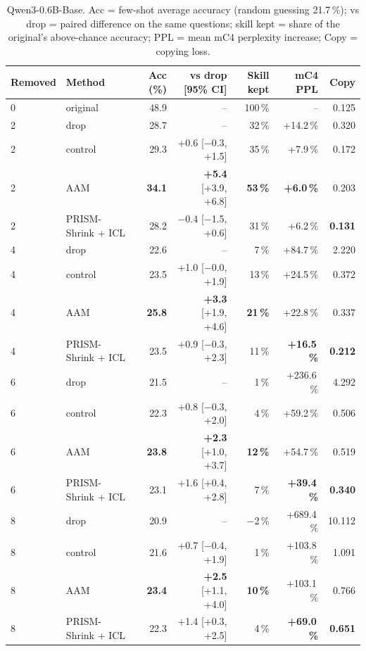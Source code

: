 \documentclass[11pt]{article}
\begin{document}
\begin{table}[t]
\centering\small
\begin{tabular}{llrrrrr}
\toprule
Removed & Method & Acc (\%) & vs drop [95\% CI] & Skill kept & mC4 PPL & Copy \\
\midrule
0 & original & 48.9 & -- & 100\,\% & -- & 0.125 \\
\midrule
2 & drop & 28.7 & -- & 32\,\% & +14.2\,\% & 0.320 \\
2 & control & 29.3 & +0.6 [$-$0.3, +1.5] & 35\,\% & +7.9\,\% & 0.172 \\
2 & AAM & \textbf{34.1} & \textbf{+5.4} [+3.9, +6.8] & \textbf{53\,\%} & \textbf{+6.0\,\%} & 0.203 \\
2 & PRISM-Shrink + ICL & 28.2 & $-$0.4 [$-$1.5, +0.6] & 31\,\% & +6.2\,\% & \textbf{0.131} \\
\midrule
4 & drop & 22.6 & -- & 7\,\% & +84.7\,\% & 2.220 \\
4 & control & 23.5 & +1.0 [$-$0.0, +1.9] & 13\,\% & +24.5\,\% & 0.372 \\
4 & AAM & \textbf{25.8} & \textbf{+3.3} [+1.9, +4.6] & \textbf{21\,\%} & +22.8\,\% & 0.337 \\
4 & PRISM-Shrink + ICL & 23.5 & +0.9 [$-$0.3, +2.3] & 11\,\% & \textbf{+16.5\,\%} & \textbf{0.212} \\
\midrule
6 & drop & 21.5 & -- & 1\,\% & +236.6\,\% & 4.292 \\
6 & control & 22.3 & +0.8 [$-$0.3, +2.0] & 4\,\% & +59.2\,\% & 0.506 \\
6 & AAM & \textbf{23.8} & \textbf{+2.3} [+1.0, +3.7] & \textbf{12\,\%} & +54.7\,\% & 0.519 \\
6 & PRISM-Shrink + ICL & 23.1 & +1.6 [+0.4, +2.8] & 7\,\% & \textbf{+39.4\,\%} & \textbf{0.340} \\
\midrule
8 & drop & 20.9 & -- & $-$2\,\% & +689.4\,\% & 10.112 \\
8 & control & 21.6 & +0.7 [$-$0.4, +1.9] & 1\,\% & +103.8\,\% & 1.091 \\
8 & AAM & \textbf{23.4} & \textbf{+2.5} [+1.1, +4.0] & \textbf{10\,\%} & +103.1\,\% & 0.766 \\
8 & PRISM-Shrink + ICL & 22.3 & +1.4 [+0.3, +2.5] & 4\,\% & \textbf{+69.0\,\%} & \textbf{0.651} \\
\bottomrule
\end{tabular}
\caption{Qwen3-0.6B-Base. Acc = few-shot average accuracy (random guessing 21.7\,\%); vs drop = paired difference
on the same questions; skill kept = share of the original's above-chance accuracy; PPL = mean mC4 perplexity
increase; Copy = copying loss.}
\label{tab:main}
\end{table}
\end{document}
